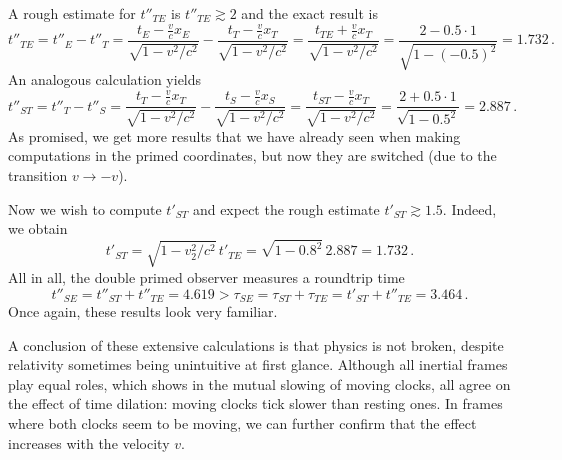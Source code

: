 \begin{ex}
\begin{itemize}
	A rough estimate for $t''_{TE}$ is $t''_{TE} \gtrsim 2$ and the exact result is
	\begin{equation*}
	t''_{TE} = t''_E - t''_T = \frac{t_E - \frac{v}{c} x_E}{\sqrt{1 - v^2 / c^2}} - \frac{t_T - \frac{v}{c} x_T}{\sqrt{1 - v^2 / c^2}} = \frac{t_{TE} + \frac{v}{c} x_T}{\sqrt{1 - v^2 / c^2}} = \frac{2 - 0.5 \cdot 1}{\sqrt{1 - (-0.5)^2}} = 1.732 \, .
	\end{equation*}
	An analogous calculation yields
	\begin{equation*}
	t''_{ST} = t''_T - t''_S = \frac{t_T - \frac{v}{c} x_T}{\sqrt{1 - v^2 / c^2}} - \frac{t_S - \frac{v}{c} x_S}{\sqrt{1 - v^2 / c^2}} = \frac{t_{ST} - \frac{v}{c} x_T}{\sqrt{1 - v^2 / c^2}} = \frac{2 + 0.5 \cdot 1}{\sqrt{1 - 0.5^2}} = 2.887 \, .
	\end{equation*}
	As promised, we get more results that we have already seen when making computations in the primed coordinates, but now they are switched (due to the transition $v \rightarrow -v$).

	Now we wish to compute $t'_{ST}$ and expect the rough estimate $t'_{ST} \gtrsim 1.5$. Indeed, we obtain
	\begin{equation*}
	t'_{ST} = \sqrt{1 - v_2^2 / c^2} \, t'_{TE} = \sqrt{1 - 0.8^2} \, 2.887 = 1.732 \, .
	\end{equation*}
	All in all, the double primed observer measures a roundtrip time
	\begin{equation*}
	t''_{SE} = t''_{ST} + t''_{TE} = 4.619 > \tau_{SE} = \tau_{ST} + \tau_{TE} = t'_{ST} + t''_{TE} = 3.464 \, .
	\end{equation*}
	Once again, these results look very familiar. 
\end{itemize}

A conclusion of these extensive calculations is that physics is not broken, despite relativity sometimes being unintuitive at first glance. Although all inertial frames play equal roles, which shows in the mutual slowing of moving clocks, all agree on the effect of time dilation: moving clocks tick slower than resting ones. In frames where both clocks seem to be moving, we can further confirm that the effect increases with the velocity $v$.


\end{ex}
